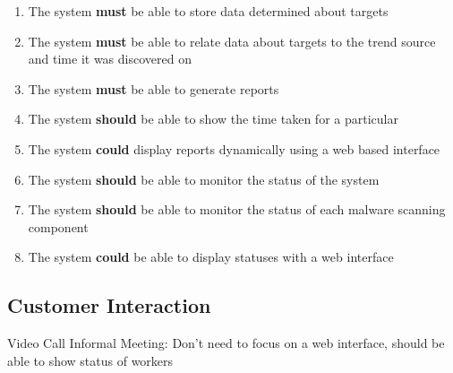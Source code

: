 \begin{enumerate}
    \item The system \textbf{must} be able to store data determined about targets
    \item The system \textbf{must} be able to relate data about targets to the trend source and time it was discovered on
    \item The system \textbf{must} be able to generate reports
    \item The system \textbf{should} be able to show the time taken for a particular 
    \item The system \textbf{could} display reports dynamically using a web based interface
    \item The system \textbf{should} be able to monitor the status of the system
    \item The system \textbf{should} be able to monitor the status of each malware scanning component
    \item The system \textbf{could} be able to display statuses with a web interface
\end{enumerate}

\subsection{Customer Interaction}
Video Call
Informal Meeting: Don't need to focus on a web interface, should be able to show status of workers

